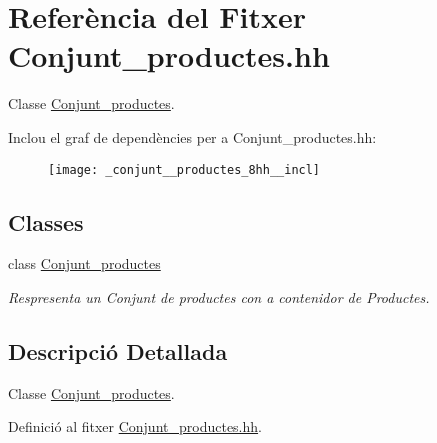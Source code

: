 \hypertarget{_conjunt__productes_8hh}{\section{Referència del Fitxer Conjunt\-\_\-productes.\-hh}
\label{_conjunt__productes_8hh}
}


Classe \hyperlink{class_conjunt__productes}{Conjunt\-\_\-productes}.  


Inclou el graf de dependències per a Conjunt\-\_\-productes.\-hh\-:\nopagebreak
\begin{figure}[H]
\begin{center}
\leavevmode
\texttt{[image: \_conjunt\_\_productes\_8hh\_\_incl]}
\end{center}
\end{figure}
\subsection*{Classes}
\begin{DoxyCompactItemize}
\item 
class \hyperlink{class_conjunt__productes}{Conjunt\-\_\-productes}
\begin{DoxyCompactList}\small\item\em Respresenta un Conjunt de productes con a contenidor de Productes. \end{DoxyCompactList}\end{DoxyCompactItemize}


\subsection{Descripció Detallada}
Classe \hyperlink{class_conjunt__productes}{Conjunt\-\_\-productes}. 

Definició al fitxer \hyperlink{_conjunt__productes_8hh_source}{Conjunt\-\_\-productes.\-hh}.

